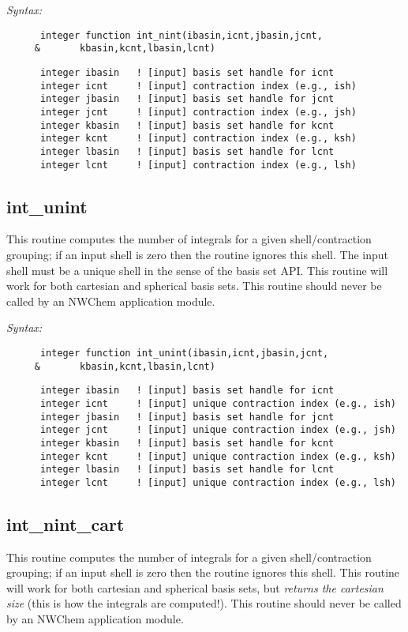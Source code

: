 {\it Syntax:} 
\begin{verbatim} 
      integer function int_nint(ibasin,icnt,jbasin,jcnt, 
     &       kbasin,kcnt,lbasin,lcnt) 
\end{verbatim} 
\begin{verbatim} 
      integer ibasin   ! [input] basis set handle for icnt 
      integer icnt     ! [input] contraction index (e.g., ish) 
      integer jbasin   ! [input] basis set handle for jcnt 
      integer jcnt     ! [input] contraction index (e.g., jsh) 
      integer kbasin   ! [input] basis set handle for kcnt 
      integer kcnt     ! [input] contraction index (e.g., ksh) 
      integer lbasin   ! [input] basis set handle for lcnt 
      integer lcnt     ! [input] contraction index (e.g., lsh) 
\end{verbatim} 
\subsection{int\_unint} 
This routine computes the number of integrals for a given  
shell/contraction grouping; if an input shell is zero then  
the routine ignores this shell.  The input shell must be a  
unique shell in the sense of the basis set API.  This  
routine will work for both cartesian and spherical basis sets. 
This routine should never be called by an NWChem  
application module. 
 
{\it Syntax:} 
\begin{verbatim} 
      integer function int_unint(ibasin,icnt,jbasin,jcnt, 
     &       kbasin,kcnt,lbasin,lcnt) 
\end{verbatim} 
\begin{verbatim} 
      integer ibasin   ! [input] basis set handle for icnt 
      integer icnt     ! [input] unique contraction index (e.g., ish) 
      integer jbasin   ! [input] basis set handle for jcnt 
      integer jcnt     ! [input] unique contraction index (e.g., jsh) 
      integer kbasin   ! [input] basis set handle for kcnt 
      integer kcnt     ! [input] unique contraction index (e.g., ksh) 
      integer lbasin   ! [input] basis set handle for lcnt 
      integer lcnt     ! [input] unique contraction index (e.g., lsh) 
\end{verbatim} 
\subsection{int\_nint\_cart} 
This routine computes the number of integrals for a given  
shell/contraction grouping; if an input shell is zero then  
the routine ignores this shell.  This  
routine will work for both cartesian and spherical basis  
sets, but {\it returns the cartesian size} (this is how the  
integrals are computed!). 
This routine should never be called by an NWChem  
application module. 
 

